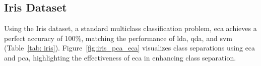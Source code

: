 \documentclass[lettersize,journal]{IEEEtran}
\begin{document}
\subsection{Iris Dataset}
Using the Iris dataset, a standard multiclass classification problem, \gls{eca} achieves a perfect accuracy of 100\%, matching the performance of \Gls{lda}, \Gls{qda}, and \Gls{svm} (Table~\ref{tab: iris}). Figure~\ref{fig:iris_pca_eca} visualizes class separations using \gls{eca} and \Gls{pca}, highlighting the effectiveness of \gls{eca} in enhancing class separation.

\begin{table}[htbp]
  \centering
  \begin{minipage}[b]{0.23\textwidth}
    \centering
    \caption{Comparison of Classifiers on the Iris Dataset}
    \label{tab: iris}
  \end{minipage}%
  \hfill
  \begin{minipage}[b]{0.23\textwidth}
    \centering
    \caption{Comparison of Classifiers on the Digits Dataset}
    \label{tab: digits}
\end{minipage}
\end{table}
\end{document}
